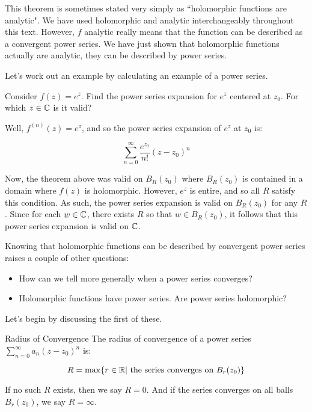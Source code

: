 This theorem is sometimes stated very simply as ``holomorphic functions are analytic". We have used holomorphic and analytic interchangeably throughout this text. However, $f$ analytic really means that the function can be described as a convergent power series. We have just shown that holomorphic functions actually are analytic, they can be described by power series.

Let's work out an example by calculating an example of a power series.

\begin{ex}{}{} Consider $f(z) = e^z$. Find the power series expansion for $e^z$ centered at $z_0$. For which $z\in \mathbb{C}$ is it valid?

Well, $f^{(n)}(z) = e^z$, and so the power series expansion of $e^z$ at $z_0$ is:

$$\sum_{n = 0}^\infty \frac{e^{z_0}}{n!}(z-z_0)^n$$

Now, the theorem above was valid on $B_R(z_0)$ where $B_R(z_0)$ is contained in a domain where $f(z)$ is holomorphic. However, $e^z$ is entire, and so all $R$ satisfy this condition. As such, the power series expansion is valid on $B_R(z_0)$ for any $R$. Since for each $w\in \mathbb{C}$, there exists $R$ so that $w\in B_R(z_0)$, it follows that this power series expansion is valid on $\mathbb{C}$.
\end{ex}

Knowing that holomorphic functions can be described by convergent power series raises a couple of other questions:

\begin{itemize}
\item How can we tell more generally when a power series converges?
\item Holomorphic functions have power series. Are power series holomorphic?
\end{itemize}

Let's begin by discussing the first of these.

\begin{defbo}{Radius of Convergence}{} The radius of convergence of a power series $\sum_{n = 0}^\infty a_n(z-z_0)^n$ is:

$$R = \max\{r\in \mathbb{R}| \text{ the series converges on } B_r(z_0)\}$$

If no such $R$ exists, then we say $R = 0$. And if the series converges on all balls $B_r(z_0)$, we say $R = \infty$.
\end{defbo}

